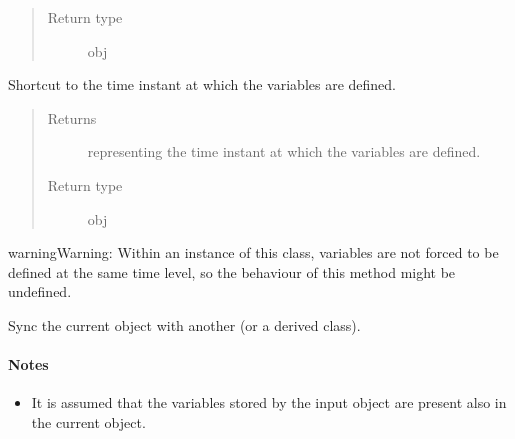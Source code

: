 \documentclass[letterpaper,10pt,english]{sphinxmanual}
\begin{document}
\begin{fulllineitems}
\begin{fulllineitems}
\begin{quote}
\begin{description}
\item[{Return type}] \leavevmode
obj

\end{description}\end{quote}

\end{fulllineitems}


\begin{fulllineitems}
\label{\detokenize{api:storages.grid_data.GridData.time}}
Shortcut to the time instant at which the variables are defined.
\begin{quote}\begin{description}
\item[{Returns}] \leavevmode
{} representing the time instant at which the variables are defined.

\item[{Return type}] \leavevmode
obj

\end{description}\end{quote}

\begin{sphinxadmonition}{warning}{Warning:}
Within an instance of this class, variables are not forced to be defined at the same time level,
so the behaviour of this method might be undefined.
\end{sphinxadmonition}

\end{fulllineitems}


\begin{fulllineitems}
\label{\detokenize{api:storages.grid_data.GridData.update}}
Sync the current object with another {\hyperref[\detokenize{api:storages.grid_data.GridData}]{}} (or a derived class).
\paragraph{Notes}
\begin{itemize}
\item {} 
It is assumed that  the variables stored by the input object are present also in the current object.


\end{itemize}
\end{fulllineitems}
\end{fulllineitems}
\end{document}
